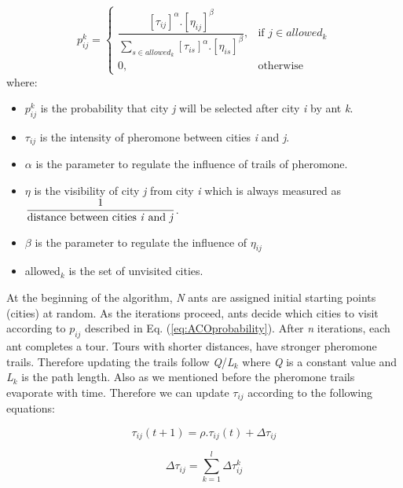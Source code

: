 \documentclass[twocolumn]{article}
\begin{document}
	\begin{equation} \label{eq:ACOprobability}
		\textit{p}^\textit{k}_\textit{ij} = 
	\begin{cases}
	{\dfrac{[\tau_{ij}]^\alpha \textbf{.} [\eta_{ij}]^\beta}
		{\sum_{s \in allowed_k} [\tau_{is}]^\alpha \textbf{.} [\eta_{is}]^\beta}  } ,& \text{if } \textit{j} \in \textit{allowed}_k
	\\
	0,& \text{otherwise}
	\end{cases}
	\end{equation}
	where:
	\begin{itemize}
		\renewcommand{\labelitemi}{-}
		\item $\textit{p}^\textit{k}_\textit{ij}$ is the probability that city \textit{j} will be selected after city \textit{i} by ant \textit{k}.
		\item $\tau_{ij}$ is the intensity of pheromone between cities \textit{i} and \textit{j}.
		\item $\alpha$ is the parameter to regulate the influence of trails of pheromone.
		\item $\eta$ is the visibility of city \textit{j} from city \textit{i} which is always measured as $\dfrac{1}{\text{distance between cities \textit{i} and \textit{j}}}$.
		\item $\beta$ is the parameter to regulate the influence of $\eta_{ij}$
		\item allowed$_k$ is the set of unvisited cities.
	\end{itemize}

	At the beginning of the algorithm, \textit{N} ants are assigned initial starting points (cities) at random. As the iterations proceed, ants decide which cities to visit according to $\textit{p}_\textit{ij}$ described in Eq. (\ref{eq:ACOprobability}). After \textit{n} iterations, each ant completes a tour. Tours with shorter distances, have stronger pheromone trails. Therefore updating the trails follow \textit{Q}/\textit{L}$_\textit{k}$ where \textit{Q} is a constant value and \textit{L}$_\textit{k}$ is the path length. Also as we mentioned before the pheromone trails evaporate with time. Therefore we can update $\tau_{ij}$ according to the following equations:
	
	\begin{equation} \label{eq:ACOTrailUpdate1}
		\tau_{ij}(t+1) = \rho \textbf{.} \tau_{ij}(t) + \Delta\tau_{ij}
	\end{equation}
	
	\begin{equation} \label{eq:ACOTrailUpdate2}
		\Delta\tau_{ij} = \sum_{k=1}^l \Delta\tau_{ij}^k
	\end{equation}
	
\end{document}
